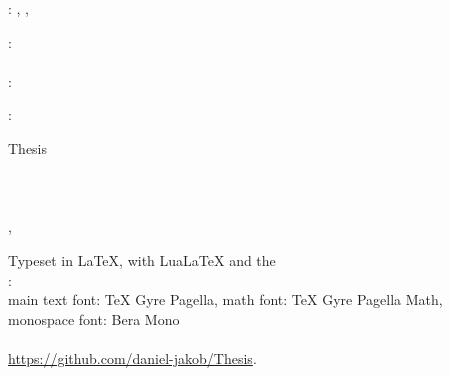 \thispagestyle{empty}

\hfill

\vfill

\noindent\myName: \textit{\myTitle}, \mySubtitle, %
\textcopyright\ ~

\bigskip

\noindent{}: \\
\myProf \\

\noindent{}: \\
\myCollaborator



\noindent{}:\\
\HoS

\bigskip
\noindent\myDegree Thesis \\
\noindent\myDepartment\\
\noindent\myFaculty\\
\noindent\myUni\\
\noindent\myLocation, \myCountry

\vfill


\medskip
\noindent Typeset in \LaTeX, with Lua\LaTeX\xspace and the \ctVersion\\
\noindent{}: \\
\noindent main text font: TeX Gyre Pagella, math font: TeX Gyre Pagella Math, monospace font: Bera Mono\\
\noindent{}\\
\url{https://github.com/daniel-jakob/Thesis}.

